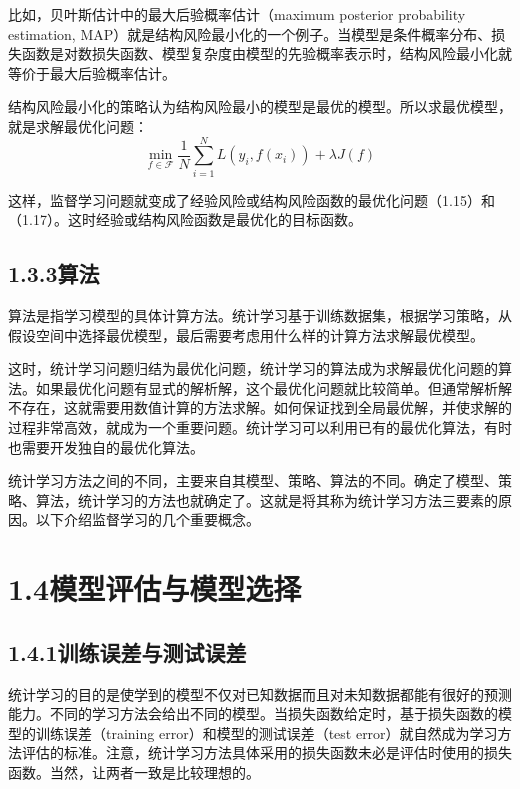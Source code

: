 \documentclass[UTF8, 12pt, fontset=fandol, oneside]{ctexart}
\begin{document}
比如，贝叶斯估计中的最大后验概率估计（maximum posterior probability estimation, MAP）就是结构风险最小化的一个例子。当模型是条件概率分布、损失函数是对数损失函数、模型复杂度由模型的先验概率表示时，结构风险最小化就等价于最大后验概率估计。

结构风险最小化的策略认为结构风险最小的模型是最优的模型。所以求最优模型，就是求解最优化问题：
\begin{equation}
  \min_{f\in\mathcal F}\frac1N\sum_{i=1}^N L(y_i,f(x_i))+\lambda J(f)
  \tag{1.17}
\end{equation}

这样，监督学习问题就变成了经验风险或结构风险函数的最优化问题（1.15）和（1.17）。这时经验或结构风险函数是最优化的目标函数。

\subsection*{1.3.3\quad 算法}

算法是指学习模型的具体计算方法。统计学习基于训练数据集，根据学习策略，从假设空间中选择最优模型，最后需要考虑用什么样的计算方法求解最优模型。

这时，统计学习问题归结为最优化问题，统计学习的算法成为求解最优化问题的算法。如果最优化问题有显式的解析解，这个最优化问题就比较简单。但通常解析解不存在，这就需要用数值计算的方法求解。如何保证找到全局最优解，并使求解的过程非常高效，就成为一个重要问题。统计学习可以利用已有的最优化算法，有时也需要开发独自的最优化算法。

统计学习方法之间的不同，主要来自其模型、策略、算法的不同。确定了模型、策略、算法，统计学习的方法也就确定了。这就是将其称为统计学习方法三要素的原因。以下介绍监督学习的几个重要概念。

\section*{1.4\quad 模型评估与模型选择}

\subsection*{1.4.1\quad 训练误差与测试误差}

统计学习的目的是使学到的模型不仅对已知数据而且对未知数据都能有很好的预测能力。不同的学习方法会给出不同的模型。当损失函数给定时，基于损失函数的模型的训练误差（training error）和模型的测试误差（test error）就自然成为学习方法评估的标准。注意，统计学习方法具体采用的损失函数未必是评估时使用的损失函数。当然，让两者一致是比较理想的。
\end{document}
